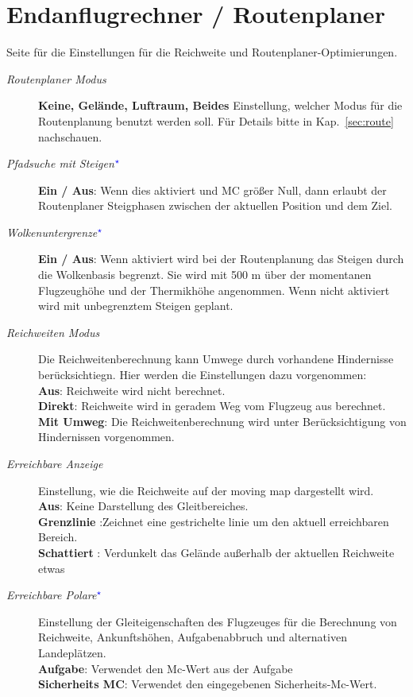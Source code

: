 \section{Endanflugrechner / Routenplaner}\label{sec:final-route}
Seite für die Einstellungen für die Reichweite und Routenplaner-Optimierungen.

\begin{description}
\item[\textit{Routenplaner Modus}]  \label{conf:routemode} {\bf Keine, Gelände, Luftraum, Beides}
  Einstellung, welcher Modus für die Routenplanung benutzt werden soll. Für Details bitte in Kap.~\ref{sec:route} nachschauen.
\item[\textit{Pfadsuche mit Steigen$^{\textcolor{blue}{\star}}$}]  {\bf Ein / Aus}: \label{conf:routeclimb} Wenn dies aktiviert und MC größer Null, dann erlaubt der Routenplaner
  Steigphasen zwischen der aktuellen Position und dem Ziel.
\item[\textit{Wolkenuntergrenze$^{\textcolor{blue}{\star}}$}]  \label{conf:routeceiling}{\bf Ein / Aus}:  Wenn aktiviert wird bei der Routenplanung  das Steigen durch die Wolkenbasis begrenzt. Sie wird mit 500 m über der momentanen Flugzeughöhe und der Thermikhöhe angenommen.
  Wenn nicht aktiviert wird mit unbegrenztem Steigen geplant.
\item[\textit{Reichweiten Modus}]  \label{conf:turningreach} Die Reichweitenberechnung kann Umwege durch vorhandene Hindernisse berücksichtiegn.
  Hier werden die Einstellungen dazu vorgenommen:\\
  {\bf Aus}: Reichweite wird nicht berechnet.\\
  {\bf Direkt}: Reichweite wird in geradem Weg vom Flugzeug aus berechnet.\\
  {\bf Mit Umweg}: Die Reichweitenberechnung wird unter Berücksichtigung von Hindernissen vorgenommen.
\item[\textit{Erreichbare Anzeige}]  \label{conf:gliderange} Einstellung, wie die Reichweite auf der moving map dargestellt wird.\\
  {\bf Aus}: Keine Darstellung des Gleitbereiches.\\
  {\bf Grenzlinie }:Zeichnet eine gestrichelte linie um den aktuell erreichbaren Bereich.\\
  {\bf Schattiert }: Verdunkelt das Gelände außerhalb der aktuellen Reichweite etwas
\item[\textit{Erreichbare Polare$^{\textcolor{blue}{\star}}$}]  \label{conf:reachpolar}
   Einstellung der Gleiteigenschaften des Flugzeuges für die Berechnung von Reichweite, Ankunftshöhen, Aufgabenabbruch und alternativen Landeplätzen.\\
  {\bf Aufgabe}: Verwendet den Mc-Wert aus der Aufgabe\\
  {\bf Sicherheits MC}: Verwendet den eingegebenen Sicherheits-Mc-Wert.
\end{description}


